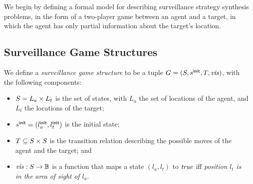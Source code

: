 We begin by defining a formal model for describing surveillance strategy synthesis problems, in the form of a two-player game between an agent and a target, in which the agent has only partial information about the target's location.

\subsection{Surveillance Game Structures}\label{sec:surveillance-games}
We define a \emph{surveillance game structure} to be  a tuple $G  = (S,s^{\mathsf{init}},T,\mathit{vis})$, with the following components:
\begin{itemize}
\item $S = L_a \times L_t$ is the set of states, with $L_a$ the set of locations of the agent, and $L_t$ the locations of the target;
\item $s^{\mathsf{init}} = (l_a^{\mathsf{init}},l_t^{\mathsf{init}})$ is the initial state;
\item $T \subseteq S \times S$ is the transition relation describing the possible moves of the agent and the target; and
\item $\mathit{vis} : S \to \mathbb{B}$ is a function that maps a state $(l_a,l_t)$ to $\mathit{true}$ iff \emph{ position $l_t$ is in the area of sight of $l_a$}.
\end{itemize}


